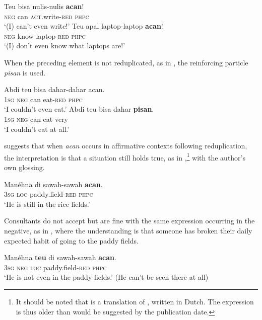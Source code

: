 \documentclass[output=paper]{langscibook}
\begin{document}
\ea\label{ex:sun:69}
    \ea\label{ex:sun:69a}
        \gll  Teu bisa nulis-nulis \textbf{acan}!\\ 
              \textsc{neg} can \textsc{act}.write-\textsc{red} \textsc{phpc}\\
        \glt ‘(I) can’t even write!’
    \ex\label{ex:sun:69b}
        \gll  Teu apal laptop-laptop \textbf{acan}!\\
              \textsc{neg} know laptop-\textsc{red} \textsc{phpc}\\
        \glt ‘(I) don’t even know what laptops are!’
    \z
\z 

 When the preceding element is not reduplicated, as in , the reinforcing particle \textit{pisan} is used. 

\ea\label{ex:sun:70}
    \ea\label{ex:sun:70a}
        \gll  Abdi teu bisa dahar-dahar acan.\\ 
              1\textsc{sg} \textsc{neg} can eat{}-\textsc{red} \textsc{phpc}\\
        \glt ‘I couldn’t even eat.’
    \ex\label{ex:sun:70b}
        \gll  Abdi teu bisa dahar \textbf{pisan}.\\
             1\textsc{sg} \textsc{neg} can eat very \\
        \glt ‘I couldn’t eat at all.’ \citep[93]{Butters2021}
    \z
\z 

\citet[2]{Hardjadibrata2003} suggests that when \textit{acan} occurs in affirmative contexts following reduplication, the interpretation is that a situation still holds true, as in ,\footnote{It should be noted that \citet{Hardjadibrata2003} is a translation of \citet{Eringa1984}, written in Dutch. The expression is thus older than would be suggested by the publication date.} with the author’s own glossing. 

\ea\label{ex:sun:71} 
    \gll Manéhna di sawah-sawah \textbf{acan}. \\ 
          3\textsc{sg} \textsc{loc} paddy.field-\textsc{red} \textsc{phpc} \\
    \glt ‘He is still in the rice fields.’ \citep[2]{Hardjadibrata2003}
\z 

Consultants do not accept  but are fine with the same expression occurring in the negative, as in , where the understanding is that someone has broken their daily expected habit of going to the paddy fields. 

\ea\label{ex:sun:72} 
    \gll  Manéhna \textbf{teu} di sawah-sawah \textbf{acan}.\\ 
          3\textsc{sg} \textsc{neg} \textsc{loc} paddy.field-\textsc{red} \textsc{phpc} \\
    \glt  ‘He is not even in the paddy fields.’ (He can’t be seen there at all) \citep[93]{Butters2021}
\z 
\end{document}
